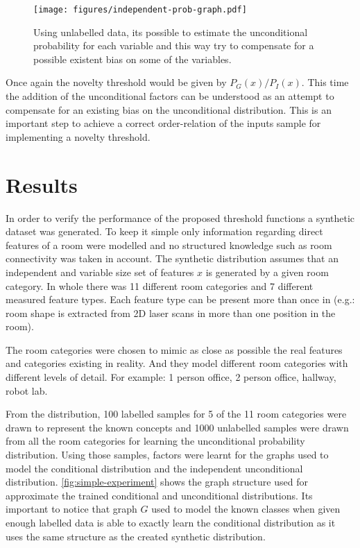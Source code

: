 \documentclass[runningheads,a4paper]{llncs}
\begin{document}
\begin{figure}[h]
\centering
\texttt{[image: figures/independent-prob-graph.pdf]}
\caption{\label{fig:semisupervised-threshold}Using unlabelled data, its possible to estimate
         the unconditional probability for each variable and this way try to compensate
         for a possible existent bias on some of the variables.}
\end{figure}

Once again the novelty threshold would be given by $P_G(x)/P_I(x)$.
This time the addition of the unconditional factors can be understood as an
attempt to compensate for an existing bias on the unconditional distribution.
This is an important step to achieve a correct order-relation of the inputs sample
for implementing a novelty threshold.


\section{Results}
\label{sec:results}

In order to verify the performance of the proposed threshold functions a synthetic dataset
was generated. To keep it simple only information regarding direct features of
a room were modelled and no structured knowledge such as room connectivity was taken
in account.
The synthetic distribution assumes that an independent and variable size set of features
$x$ is generated by a given room category.
In whole there was 11 different room categories and 7 different measured feature
types. Each feature type can be present more than once in (e.g.: room shape is
extracted from 2D laser scans in more than one position in the room).

The room categories were chosen to mimic as close as possible the real features and
categories existing in reality. And they model different room categories with
different levels of detail. For example: 1 person office, 2 person office, hallway,
robot lab.

From the distribution, 100 labelled samples for 5 of the 11 room categories were
drawn to represent the known concepts and 1000 unlabelled samples were drawn from
all the room categories for learning the unconditional probability distribution.
Using those samples, factors were learnt for the graphs used to model the
conditional distribution and the independent unconditional distribution.
\autoref{fig:simple-experiment} shows the graph structure used for approximate the
trained conditional and unconditional distributions.
Its important to notice that graph $G$ used to model the known classes when given
enough labelled data is able to exactly learn the conditional distribution as it
uses the same structure as the created synthetic distribution.
\end{document}
